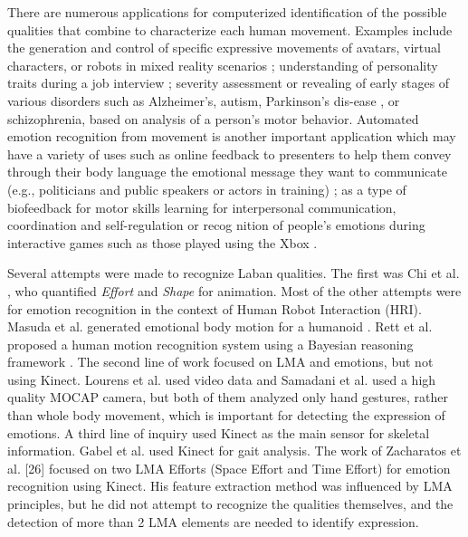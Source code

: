 \documentclass[11pt,twocolumn,varwidth=true,a4paper,fleqn]{sigchi}
\begin{document}
\mbox{}
\par
There are numerous applications for computerized identification of
the possible qualities that combine to characterize each human
movement. Examples include the generation and control of specific
expressive movements of avatars, virtual characters, or robots in
mixed reality scenarios \cite{Masuda}; understanding of personality traits during a job interview \cite{levy2003use}; severity assessment or revealing of early stages of various disorders such as Alzheimer's, autism, Parkinson's dis-ease \cite{camurri2003application}, or schizophrenia, based on analysis
of a person's motor behavior. Automated emotion recognition from
movement is another important application which may have a
variety of uses such as online feedback to presenters to
help them convey through their body language
the emotional message they want to
communicate (e.g., politicians and public
speakers or actors in training) \cite{nguyen2012online}; as a type of biofeedback for motor skills learning for interpersonal communication,
coordination and self-regulation or recog
nition of people's emotions during interactive games such as those
played using the Xbox \cite{Zacharatos}.
\mbox{}\\
\par
Several attempts were made to recognize Laban qualities. The first was Chi
et al. \cite{chi2000emote}, who quantified \textit{Effort} and \textit{Shape} for animation.
Most of the other attempts were for emotion recognition in the context of Human Robot Interaction (HRI).
Masuda et al. generated emotional body motion for a humanoid \cite{Masuda}.
Rett et al. proposed a human motion recognition system using a Bayesian reasoning framework \cite{Rett}.
The second line of work focused on LMA and emotions, but not using Kinect.
Lourens et al. \cite{lourens2010communicating} used video data and Samadani et al.
\cite{samadani2013laban} used a high quality MOCAP camera, but both of them
analyzed only hand gestures, rather than whole body movement, which is important for detecting the expression of emotions. A third line of inquiry used Kinect as the main sensor for skeletal information. Gabel et al. \cite{gabel2012full} used Kinect for gait analysis. 
The work of Zacharatos et al. [26] focused on two LMA Efforts (Space Effort and Time Effort) for emotion recognition using Kinect. His feature extraction method was influenced by LMA principles, but he did not attempt to recognize the qualities themselves, and the detection of more than 2 LMA elements are needed to identify expression.
\end{document}
